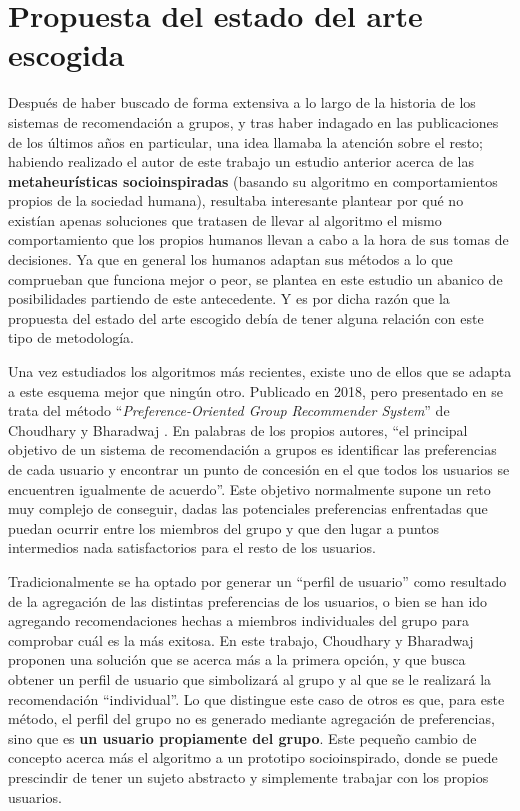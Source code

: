 \section{Propuesta del estado del arte escogida}

Después de haber buscado de forma extensiva a lo largo de la historia de los sistemas de recomendación a grupos, y tras haber indagado en las publicaciones de los últimos años en particular, una idea llamaba la atención sobre el resto; habiendo realizado el autor de este trabajo un estudio anterior acerca de las \textbf{metaheurísticas socioinspiradas} (basando su algoritmo en comportamientos propios de la sociedad humana), resultaba interesante plantear por qué no existían apenas soluciones que tratasen de llevar al algoritmo el mismo comportamiento que los propios humanos llevan a cabo a la hora de sus tomas de decisiones. Ya que en general los humanos adaptan sus métodos a lo que comprueban que funciona mejor o peor, se plantea en este estudio un abanico de posibilidades partiendo de este antecedente. Y es por dicha razón que la propuesta del estado del arte escogido debía de tener alguna relación con este tipo de metodología.

Una vez estudiados los algoritmos más recientes, existe uno de ellos que se adapta a este esquema mejor que ningún otro. Publicado en 2018, pero presentado en se trata del método ``\textit{Preference-Oriented Group Recommender System}'' de Choudhary y Bharadwaj \cite{pogrs}. En palabras de los propios autores, ``el principal objetivo de un sistema de recomendación a grupos es identificar las preferencias de cada usuario y encontrar un punto de concesión en el que todos los usuarios se encuentren igualmente de acuerdo''. Este objetivo normalmente supone un reto muy complejo de conseguir, dadas las potenciales preferencias enfrentadas que puedan ocurrir entre los miembros del grupo y que den lugar a puntos intermedios nada satisfactorios para el resto de los usuarios.

Tradicionalmente se ha optado por generar un ``perfil de usuario'' como resultado de la agregación de las distintas preferencias de los usuarios, o bien se han ido agregando recomendaciones hechas a miembros individuales del grupo para comprobar cuál es la más exitosa. En este trabajo, Choudhary y Bharadwaj proponen una solución que se acerca más a la primera opción, y que busca obtener un perfil de usuario que simbolizará al grupo y al que se le realizará la recomendación ``individual''. Lo que distingue este caso de otros es que, para este método, el perfil del grupo no es generado mediante agregación de preferencias, sino que es \textbf{un usuario propiamente del grupo}. Este pequeño cambio de concepto acerca más el algoritmo a un prototipo socioinspirado, donde se puede prescindir de tener un sujeto abstracto y simplemente trabajar con los propios usuarios.

